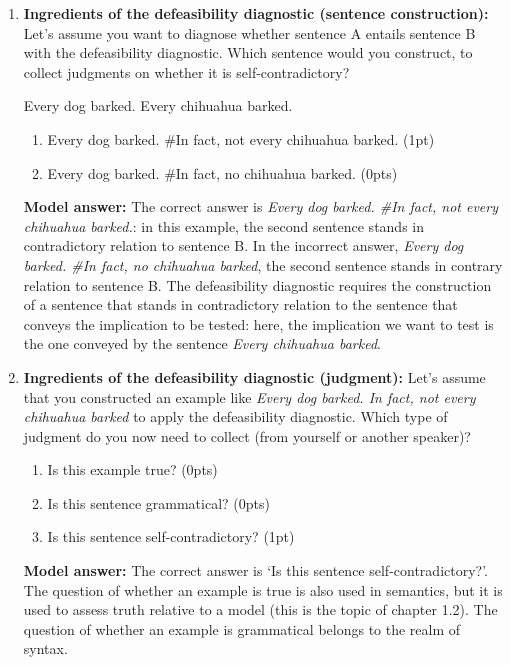 \documentclass[a4,11pt]{article}
\begin{document}
\begin{enumerate}[leftmargin = 12pt]
\item {\bf Ingredients of the defeasibility diagnostic (sentence construction):} Let's assume you want to diagnose whether sentence A entails sentence B with the defeasibility diagnostic. Which sentence would you construct, to collect judgments on whether it is self-contradictory?

\begin{exe}
\exi{}
\begin{xlist}
 Every dog barked.
 Every chihuahua barked.
\end{xlist}
\end{exe}
\begin{enumerate}
    \item Every dog barked. \#In fact, not every chihuahua barked. (1pt)
    \item Every dog barked. \#In fact, no chihuahua barked. (0pts)
\end{enumerate}

{\bf Model answer:} The correct answer is {\em Every dog barked. \#In fact, not every chihuahua barked.}: in this example, the second sentence stands in contradictory relation to sentence B. In the incorrect answer, {\em Every dog barked. \#In fact, no chihuahua barked}, the second sentence stands in contrary relation to sentence B. The defeasibility diagnostic requires the construction of a sentence that stands in contradictory relation to the sentence that conveys the implication to be tested: here, the implication we want to test is the one conveyed by the sentence {\em Every chihuahua barked}. 

\item {\bf Ingredients of the defeasibility diagnostic (judgment):} Let's assume that you constructed an example like {\em Every dog barked. In fact, not every chihuahua barked} to apply the defeasibility diagnostic. Which type of judgment do you now need to collect (from yourself or another speaker)?

\begin{enumerate}
    \item Is this example true? (0pts)
    \item Is this sentence grammatical? (0pts)
     \item Is this sentence self-contradictory? (1pt)
\end{enumerate}

{\bf Model answer:} The correct answer is `Is this sentence self-contradictory?'. The question of whether an example is true is also used in semantics, but it is used to assess truth relative to a model (this is the topic of chapter 1.2). The question of whether an example is grammatical belongs to the realm of syntax. 


\end{enumerate}
\end{document}
